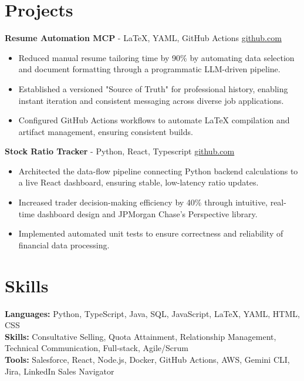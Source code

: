 \documentclass[11pt]{article}       %
\begin{document}
\vspace{-18.5pt}

\section*{Projects}

\textbf{Resume Automation MCP}{ - LaTeX, YAML, GitHub Actions} \hfill \href{https://github.com/Monica20030707/Tex_OrangeLeaf-mcp}{github.com} \\
\vspace{-9pt}
\begin{itemize}
  \item Reduced manual resume tailoring time by 90\% by automating data selection and document formatting through a programmatic LLM-driven pipeline.
  \item Established a versioned "Source of Truth" for professional history, enabling instant iteration and consistent messaging across diverse job applications.
  \item Configured GitHub Actions workflows to automate LaTeX compilation and artifact management, ensuring consistent builds.
\end{itemize}

\textbf{Stock Ratio Tracker}{ - Python, React, Typescript} \hfill \href{https://github.com/Monica20030707/tradingDashboard-UI}{github.com} \\
\vspace{-9pt}
\begin{itemize}
  \item Architected the data-flow pipeline connecting Python backend calculations to a live React dashboard, ensuring stable, low-latency ratio updates.
  \item Increased trader decision-making efficiency by 40\% through intuitive, real-time dashboard design and JPMorgan Chase’s Perspective library.
  \item Implemented automated unit tests to ensure correctness and reliability of financial data processing.
\end{itemize}

\vspace{-18.5pt}


\section*{Skills}
\textbf{Languages:} Python, TypeScript, Java, SQL, JavaScript, LaTeX, YAML, HTML, CSS\\
\textbf{Skills:} Consultative Selling, Quota Attainment, Relationship Management, Technical Communication, Full-stack, Agile/Scrum\\
\textbf{Tools:} Salesforce, React, Node.js, Docker, GitHub Actions, AWS, Gemini CLI, Jira, LinkedIn Sales Navigator\\

\vspace{-6.5pt}
\end{document}

